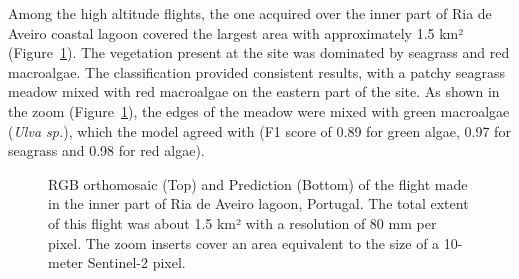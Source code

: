 \documentclass[
  number]{elsarticle}
\begin{document}
Among the high altitude flights, the one acquired over the inner part of
Ria de Aveiro coastal lagoon covered the largest area with approximately
1.5 km² (Figure~\ref{fig-Boat}). The vegetation present at the site was
dominated by seagrass and red macroalgae. The classification provided
consistent results, with a patchy seagrass meadow mixed with red
macroalgae on the eastern part of the site. As shown in the zoom
(Figure~\ref{fig-Boat}), the edges of the meadow were mixed with green
macroalgae (\emph{Ulva sp.}), which the model agreed with (F1 score of
0.89 for green algae, 0.97 for seagrass and 0.98 for red algae).

\label{cell-fig-Boat}
\begin{figure}[H]


\caption{\label{fig-Boat}RGB orthomosaic (Top) and Prediction (Bottom)
of the flight made in the inner part of Ria de Aveiro lagoon, Portugal.
The total extent of this flight was about 1.5 km² with a resolution of
80 mm per pixel. The zoom inserts cover an area equivalent to the size
of a 10-meter Sentinel-2 pixel.}

\end{figure}%
\end{document}
